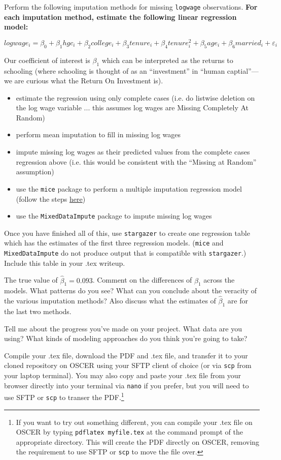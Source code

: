 \documentclass[12pt,english]{exam}
\begin{document}
\begin{questions}
\question Perform the following imputation methods for missing \texttt{logwage} observations. \textbf{For each imputation method, estimate the following linear regression model:}

\[
    logwage_{i} = \beta_{0} +  \beta_{1}hgc_{i} + \beta_{2}college_{i} + \beta_{3}tenure_{i} + \beta_{4}tenure^{2}_{i} + \beta_{5}age_{i} + \beta_{6}married_{i} + \varepsilon_{i}
\]

Our coefficient of interest is $\beta_{1}$ which can be interpreted as the returns to schooling (where schooling is thought of as an ``investment'' in ``human captial''---we are curious what the Return On Investment is).

\begin{itemize}
    \item estimate the regression using only complete cases (i.e. do listwise deletion on the log wage variable ... this assumes log wages are Missing Completely At Random)
    \item perform mean imputation to fill in missing log wages
    \item impute missing log wages as their predicted values from the complete cases regression above (i.e. this would be consistent with the ``Missing at Random'' assumption)
    \item use the \texttt{mice} package to perform a multiple imputation regression model (follow the steps \href{https://rpubs.com/mhanauer/mice}{here})
    \item use the \texttt{MixedDataImpute} package to impute missing log wages
\end{itemize}

Once you have finished all of this, use \texttt{stargazer} to create one regression table which has the estimates of the first three regression models. (\texttt{mice} and \texttt{MixedDataImpute} do not produce output that is compatible with \texttt{stargazer}.) Include this table in your .tex writeup. 

The true value of $\hat{\beta}_{1}=0.093$. Comment on the differences of $\hat{\beta}_{1}$ across the models. What patterns do you see? What can you conclude about the veracity of the various imputation methods? Also discuss what the estimates of $\hat{\beta}_{1}$ are for the last two methods.

\question Tell me about the progress you've made on your project. What data are you using? What kinds of modeling approaches do you think you're going to take?  

\question Compile your .tex file, download the PDF and .tex file, and transfer it to your cloned repository on OSCER using your SFTP client of choice (or via \texttt{scp} from your laptop terminal). You may also copy and paste your .tex file from your browser directly into your terminal via \texttt{nano} if you prefer, but you will need to use SFTP or \texttt{scp} to transer the PDF.\footnote{If you want to try out something different, you can compile your .tex file on OSCER by typing \texttt{pdflatex myfile.tex} at the command prompt of the appropriate directory. This will create the PDF directly on OSCER, removing the requirement to use SFTP or \texttt{scp} to move the file over.}


\end{questions}
\end{document}
